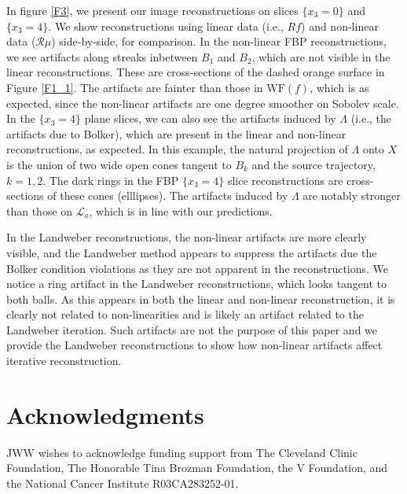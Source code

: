 \documentclass[11pt]{article}
\newcommand{\WF}{\mathrm{WF}}
\newcommand{\CL}{\mathcal L}
\numberwithin{equation}{section}
\theoremstyle{definition}
\begin{document}
In figure \ref{F3}, we present our image reconstructions on slices $\{x_3 = 0\}$ and $\{x_3 = 4\}$. We show reconstructions using linear data (i.e., $Rf$) and non-linear data ($\mathcal{R}\mu$) side-by-side, for comparison. In the non-linear FBP reconstructions, we see artifacts along streaks inbetween $B_1$ and $B_2$, which are not visible in the linear reconstructions. These are cross-sections of the dashed orange surface in Figure \ref{F1_1}. The artifacts are fainter than those in $\WF(f)$, which is as expected, since the non-linear artifacts are one degree smoother on Sobolev scale. In the $\{x_3 = 4\}$ plane slices, we can also see the artifacts induced by $\Lambda$ (i.e., the artifacts due to Bolker), which are present in the linear and non-linear reconstructions, as expected. In this example, the natural projection of $\Lambda$ onto $X$ is the union of two wide open cones tangent to $B_k$ and the source trajectory, $k=1,2$. The dark rings in the FBP $\{x_3 = 4\}$ slice reconstructions are cross-sections of these cones (elllipses). The artifacts induced by $\Lambda$ are notably stronger than those on $\CL_a$, which is in line with our predictions. 

In the Landweber reconstructions, the non-linear artifacts are more clearly visible, and the Landweber method appears to suppress the artifacts due the Bolker condition violations as they are not apparent in the reconstructions. We notice a ring artifact in the Landweber reconstructions, which looks tangent to both balls. As this appears in both the linear and non-linear reconstruction, it is clearly not related to non-linearities and is likely an artifact related to the Landweber iteration. Such artifacts are not the purpose of this paper and we provide the Landweber reconstructions to show how non-linear artifacts affect iterative reconstruction.


\section*{Acknowledgments}
JWW wishes to acknowledge funding support from The Cleveland Clinic Foundation, The Honorable Tina Brozman Foundation, the V Foundation, and the National Cancer Institute R03CA283252-01. 




\end{document}
